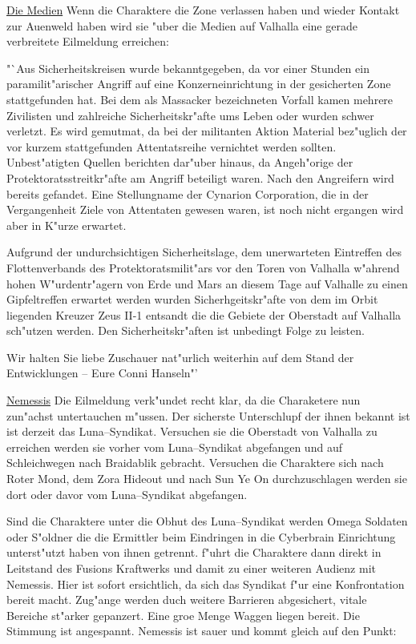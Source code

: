 
\underline{Die Medien} Wenn die Charaktere die Zone verlassen haben und wieder Kontakt zur Au\3enweld haben wird sie "uber die Medien auf Valhalla eine gerade verbreitete Eilmeldung erreichen:

"`Aus Sicherheitskreisen wurde bekanntgegeben, da\3 vor einer Stunden ein paramilit"arischer Angriff auf eine Konzerneinrichtung in der 
gesicherten Zone stattgefunden hat. Bei dem als Massacker bezeichneten Vorfall kamen mehrere Zivilisten und zahlreiche Sicherheitskr"afte ums Leben oder wurden schwer verletzt. Es wird gemutma\3t, da\3 bei der militanten Aktion Material bez"uglich der vor kurzem stattgefunden Attentatsreihe vernichtet werden sollten. Unbest"atigten Quellen berichten dar"uber hinaus, da\3 Angeh"orige der Protektoratsstreitkr"afte am Angriff beteiligt waren. Nach den Angreifern wird bereits gefandet. Eine Stellungname der Cynarion Corporation, die in der Vergangenheit Ziele von Attentaten gewesen waren, ist noch nicht ergangen wird aber in K"urze erwartet.

Aufgrund der undurchsichtigen Sicherheitslage, dem unerwarteten Eintreffen des Flottenverbands des Protektoratsmilit"ars vor den Toren von Valhalla w"ahrend hohen W"urdentr"agern von Erde und Mars an diesem Tage auf Valhalle zu einen Gipfeltreffen erwartet werden wurden Sicherhgeitskr"afte von dem im Orbit liegenden Kreuzer Zeus II-1 entsandt die die Gebiete der Oberstadt auf Valhalla sch"utzen werden. Den Sicherheitskr"aften ist unbedingt Folge zu leisten.

Wir halten Sie liebe Zuschauer nat"urlich weiterhin auf dem Stand der Entwicklungen -- Eure Conni Hanseln"'

\underline{Nemessis} Die Eilmeldung verk"undet recht klar, da\3 die Charaketere nun zun"achst untertauchen m"ussen. Der sicherste Unterschlupf der ihnen bekannt ist ist derzeit das Luna--Syndikat. Versuchen sie die Oberstadt von Valhalla zu erreichen werden sie vorher vom Luna--Syndikat abgefangen und auf Schleichwegen nach Braidablik gebracht. Versuchen die Charaktere sich nach Roter Mond, dem Zora Hideout und nach Sun Ye On durchzuschlagen werden sie dort oder davor vom Luna--Syndikat abgefangen.

Sind die Charaktere unter die Obhut des Luna--Syndikat werden Omega Soldaten oder S"oldner die die Ermittler beim Eindringen in die Cyberbrain Einrichtung unterst"utzt haben von ihnen getrennt. \xl{} f"uhrt die Charaktere dann direkt in Leitstand des Fusions Kraftwerks und damit zu einer weiteren Audienz mit Nemessis. Hier ist sofort ersichtlich, da\3 sich das Syndikat f"ur eine Konfrontation bereit macht. Zug"ange werden duch weitere Barrieren abgesichert, vitale Bereiche st"arker gepanzert. Eine gro\3e Menge Waggen liegen bereit. Die Stimmung ist angespannt. Nemessis ist sauer und kommt gleich auf den Punkt: 

